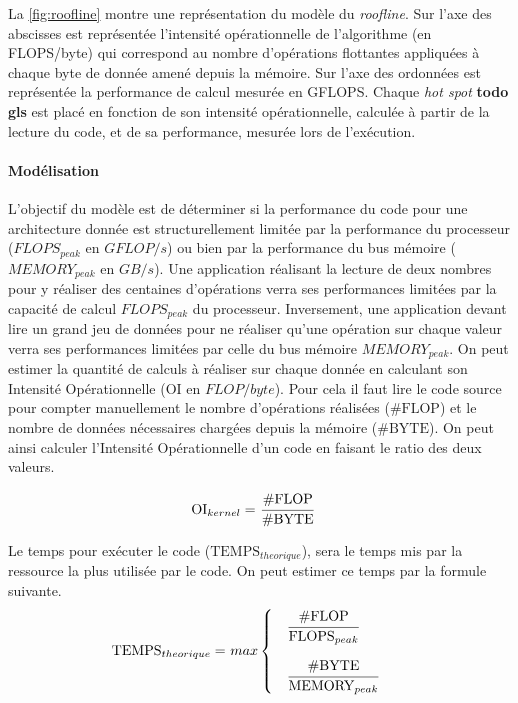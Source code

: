             
            La \autoref{fig:roofline} montre une représentation du modèle du \textit{roofline}. Sur l’axe des abscisses est représentée l’intensité opérationnelle de l’algorithme (en FLOPS/byte) qui correspond au nombre d’opérations flottantes appliquées à chaque byte de donnée amené depuis la mémoire. Sur l’axe des ordonnées est représentée la performance de calcul mesurée en GFLOPS.
            Chaque \textit{hot spot} \textbf{todo gls} est placé en fonction de son intensité opérationnelle, calculée à partir de la lecture du code, et de sa performance, mesurée lors de l’exécution.
        
        \paragraph{Modélisation}
            L’objectif du modèle est de déterminer si la performance du code pour une architecture donnée est structurellement limitée par la performance du processeur ($FLOPS_{peak}$ en $GFLOP/s$) ou bien par la performance du bus mémoire ($MEMORY_{peak}$ en $GB/s$). Une application réalisant la lecture de deux nombres pour y réaliser des centaines d’opérations verra ses performances limitées par la capacité de calcul $FLOPS_{peak}$ du processeur. Inversement, une application devant lire un grand jeu de données pour ne réaliser qu'une opération sur chaque valeur verra ses performances limitées par celle du bus mémoire $MEMORY_{peak}$. On peut estimer la quantité de calculs à réaliser sur chaque donnée en calculant son Intensité Opérationnelle  ($\text{OI}$ en $FLOP/byte$). Pour cela il faut lire le code source pour compter manuellement le nombre d’opérations réalisées ($\text{\#FLOP}$) et le nombre de données nécessaires chargées depuis la mémoire ($\text{\#BYTE}$). On peut ainsi calculer l’Intensité Opérationnelle d’un code en faisant le ratio des deux valeurs.
            
            \begin{equation}
            \begin{aligned}
                    \text{OI}_{kernel} =\ &\cfrac{\text{\#FLOP}}{\text{\#BYTE}}
            \end{aligned}
            \end{equation}
            
            Le temps pour exécuter le code ($\text{TEMPS}_{theorique}$), sera le temps mis par la ressource la plus utilisée par le code. On peut estimer ce temps par la formule suivante.
            \begin{equation}
            \begin{aligned}
                 \text{TEMPS}_{theorique} =\  &max 
                 \begin{cases} 
                    \quad \cfrac{\text{\#FLOP}}{\text{FLOPS}_{peak}}    \\[15pt]
                    \quad \cfrac{\text{\#BYTE}}{\text{MEMORY}_{peak}}
                \end{cases}
            \end{aligned}
            \end{equation}
            
